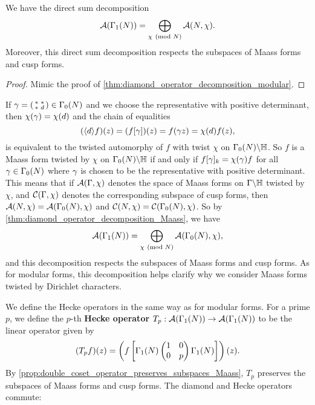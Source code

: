       \begin{proposition}\label{thm:diamond_operator_decomposition_Maass}
        We have the direct sum decomposition
        \[
          \mathcal{A}(\Gamma_{1}(N)) = \bigoplus_{\chi \ \left(\text{mod }N\right)}\mathcal{A}(N,\chi).
        \]
        Moreover, this direct sum decomposition respects the subspaces of Maass forms and cusp forms.
      \end{proposition}
      \begin{proof}
        Mimic the proof of \cref{thm:diamond_operator_decomposition_modular}.
      \end{proof}

      If $\gamma = \begin{psmallmatrix} \ast & \ast \\ \ast & d \end{psmallmatrix} \in \Gamma_{0}(N)$ and we choose the representative with positive determinant, then $\chi(\gamma) = \chi(d)$ and the chain of equalities
      \[
        (\langle d\rangle f)(z) = (f[\gamma])(z) = f(\gamma z) = \chi(d)f(z),
      \]
      is equivalent to the twisted automorphy of $f$ with twist $\chi$ on $\Gamma_{0}(N)\backslash\mathbb{H}$. So $f$ is a Maass form twisted by $\chi$ on $\Gamma_{0}(N)\backslash\mathbb{H}$ if and only if $f[\gamma]_{k} = \chi(\gamma)f$ for all $\gamma \in \Gamma_{0}(N)$ where $\gamma$ is chosen to be the representative with positive determinant. This means that if $\mathcal{A}(\Gamma,\chi)$ denotes the space of Maass forms on $\Gamma\backslash\mathbb{H}$ twisted by $\chi$, and $\mathcal{C}(\Gamma,\chi)$ denotes the corresponding subspace of cusp forms, then $\mathcal{A}(N,\chi) = \mathcal{A}(\Gamma_{0}(N),\chi)$ and $\mathcal{C}(N,\chi) = \mathcal{C}(\Gamma_{0}(N),\chi)$. So by \cref{thm:diamond_operator_decomposition_Maass}, we have
      \[
        \mathcal{A}(\Gamma_{1}(N)) = \bigoplus_{\chi \ \left(\text{mod }N\right)}\mathcal{A}(\Gamma_{0}(N),\chi),
      \]
      and this decomposition respects the subspaces of Maass forms and cusp forms. As for modular forms, this decomposition helps clarify why we  consider Maass forms twisted by Dirichlet characters.
      
      We define the Hecke operators in the same way as for modular forms. For a prime $p$, we define the $p$-th \textbf{Hecke operator} $T_{p}:\mathcal{A}(\Gamma_{1}(N)) \to \mathcal{A}(\Gamma_{1}(N))$ to be the linear operator given by
      \[
        (T_{p}f)(z) = \left(f\left[\Gamma_{1}(N)\begin{pmatrix} 1 & 0 \\ 0 & p \end{pmatrix}\Gamma_{1}(N)\right]\right)(z).
      \]
      By \cref{prop:double_coset_operator_preserves_subspaces_Maass}, $T_{p}$ preserves the subspaces of Maass forms and cusp forms. The diamond and Hecke operators commute:

